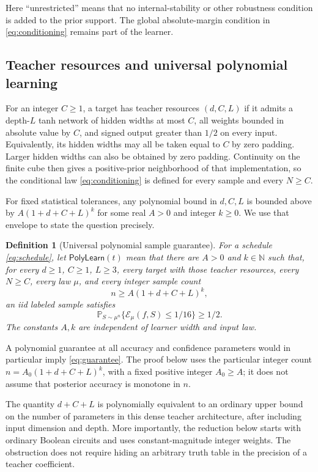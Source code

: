 \documentclass[11pt]{article}
\newtheorem{definition}[theorem]{Definition}
\theoremstyle{remark}\newtheorem{remark}[theorem]{Remark}
\newcommand{\Prb}{\mathbb P}
\begin{document}
Here ``unrestricted'' means that no internal-stability or other robustness
condition is added to the prior support. The global absolute-margin
condition in \eqref{eq:conditioning} remains part of the learner.

\subsection{Teacher resources and universal polynomial learning}

For an integer $C\ge1$, a target has teacher resources $(d,C,L)$ if it admits a depth-$L$ tanh
network of hidden widths at most $C$, all weights bounded in absolute
value by $C$, and signed output greater than $1/2$ on every input.
Equivalently, its hidden widths may all be taken equal to $C$ by zero padding. Larger hidden widths can also be obtained by zero padding. Continuity on the
finite cube then gives a positive-prior neighborhood of that
implementation, so the conditional law \eqref{eq:conditioning} is defined
for every sample and every $N\ge C$.

For fixed statistical tolerances, any polynomial bound in $d,C,L$ is
bounded above by $A(1+d+C+L)^k$ for some real $A>0$ and integer $k\ge0$.
We use that envelope to state the question precisely.

\begin{definition}[Universal polynomial sample guarantee]\label{def:poly}
For a schedule \eqref{eq:schedule}, let $\mathsf{PolyLearn}(t)$ mean that
there are $A>0$ and $k\in\mathbb N$ such that, for every
$d\ge1$, $C\ge1$, $L\ge3$, every target with those teacher resources,
every $N\ge C$, every law $\mu$, and every integer sample count
\begin{equation}\label{eq:sample}
 n\ge A(1+d+C+L)^k,
\end{equation}
an iid labeled sample satisfies
\begin{equation}\label{eq:guarantee}
 \Prb_{S\sim\mu^n}\{\mathcal E_\mu(f,S)\le1/16\}\ge1/2.
\end{equation}
The constants $A,k$ are independent of learner width and input law.
\end{definition}

A polynomial guarantee at all accuracy and confidence parameters would
in particular imply \eqref{eq:guarantee}. The proof below uses the
particular integer count $n=A_0(1+d+C+L)^k$, with a fixed positive integer
$A_0\ge A$; it does not assume that posterior accuracy is monotone in $n$.

The quantity $d+C+L$ is polynomially equivalent to an ordinary upper bound
on the number of parameters in this dense teacher architecture, after
including input dimension and depth. More importantly, the reduction
below starts with ordinary Boolean circuits and uses constant-magnitude
integer weights. The obstruction does not require hiding an arbitrary
truth table in the precision of a teacher coefficient.
\end{document}
